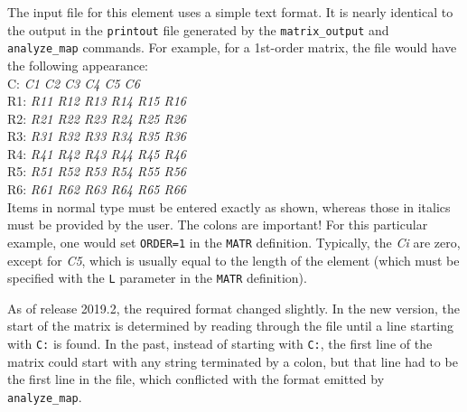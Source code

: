 The input file for this element uses a simple text format.  It is nearly identical
to the output in the {\tt printout} file generated by the {\tt matrix\_output}
and {\tt analyze\_map} commands.  For example, for a 1st-order matrix, the file would have the
following appearance:\\
C: {\em C1 C2 C3 C4 C5 C6}\\
R1: {\em R11 R12 R13 R14 R15 R16}\\
R2: {\em R21 R22 R23 R24 R25 R26}\\
R3: {\em R31 R32 R33 R34 R35 R36}\\
R4: {\em R41 R42 R43 R44 R45 R46}\\
R5: {\em R51 R52 R53 R54 R55 R56}\\
R6: {\em R61 R62 R63 R64 R65 R66}\\

Items in normal type must be entered exactly as shown, whereas those in
italics must be provided by the user.  The colons are important!
For this particular example, one would set {\tt ORDER=1} in the {\tt MATR}
definition.  Typically, the {\em Ci} are zero, except for {\em C5}, which
is usually equal to the length of the element (which must be specified with
the {\tt L} parameter in the {\tt MATR} definition).

As of release 2019.2, the required format changed slightly. 
In the new version, the start of the matrix is determined by reading through the file until 
a line starting with \verb|C:| is found.
In the past, 
instead of starting with \verb|C:|, the first line of the matrix could start
with any string terminated by a colon, but that line had to be the first line in the
file, which conflicted with the format emitted by \verb|analyze_map|.
